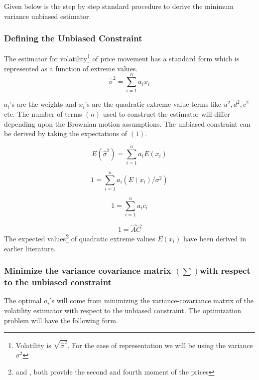 \documentclass[12pt]{article}   	%
\begin{document}
Given below is the step by step standard procedure to derive the minimum variance unbiased estimator. 
\subsubsection{Defining the Unbiased Constraint}
The estimator for volatility\footnote{Volatility is $\sqrt{\hat{\sigma}^2}$. For the ease of representation we will be using the variance $\sigma^2$} of price movement has a standard form which is represented as a function of extreme values.
\begin{equation}
 \hat{\sigma}^2 = \sum_{i=1}^{n} a_i x_i
\end{equation}

$a_i$'s are the weights and $x_i$'s are the quadratic extreme value terms like $u^2, d^2, c^2$ etc. 
The number of terms $(n)$ used to construct the estimator will differ depending upon the Brownian motion assumptions.
The unbiased constraint can be derived by taking the expectations of $(1)$.

\begin{equation}
 E(\hat{\sigma}^2) = \sum_{i=1}^{n} a_i E(x_i)
\end{equation}

\begin{equation}
 1= \sum_{i=1}^{n} a_i (E(x_i)/\sigma^2)
\end{equation}

\begin{equation}
 1= \sum_{i=1}^{n} a_i c_i
\end{equation}

\begin{equation}
 1= \vec{A}\vec{C}
\end{equation}
The expected values\footnote{\citealp{garman1980} and \citealp{meilijson2008}, both provide the second and fourth moment of the prices} of quadratic extreme values $E(x_i )$ have been derived in earlier literature.

\subsubsection{Minimize the variance covariance matrix $(\sum)$with respect to the unbiased constraint}

The optimal $a_i$'s will come from minimizing the variance-covariance matrix of the volatility estimator with respect to 
the unbiased constraint. The optimization problem will have the following form.
\end{document}
